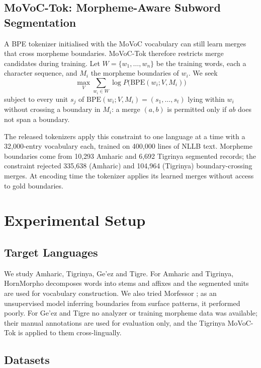 \documentclass[11pt]{article}
\newcommand{\movoctok}{MoVoC-Tok}
\begin{document}
\subsection{MoVoC-Tok: Morpheme-Aware Subword Segmentation}
\label{sec:movoctok}

A BPE tokenizer initialised with the MoVoC vocabulary can still learn merges
that cross morpheme boundaries. \movoctok{} therefore restricts merge
candidates during training. Let $W = \{w_1, \dots, w_n\}$ be the training words,
each a character sequence, and $M_i$ the morpheme boundaries of $w_i$. We seek
\begin{equation}
  \max_V \sum_{w_i \in W} \log P\bigl(\mathrm{BPE}(w_i; V, M_i)\bigr)
\end{equation}
subject to every unit $s_j$ of $\mathrm{BPE}(w_i; V, M_i) = (s_1, \dots, s_t)$
lying within $w_i$ without crossing a boundary in $M_i$: a merge $(a,b)$ is
permitted only if $ab$ does not span a boundary.

The released tokenizers apply this constraint to one language at a time with
a 32,000-entry vocabulary each, trained on 400,000 lines of NLLB text. Morpheme
boundaries come from 10,293 Amharic and 6,692 Tigrinya segmented records; the
constraint rejected 335,638 (Amharic) and 104,964 (Tigrinya)
boundary-crossing merges. At encoding time the tokenizer applies its learned
merges without access to gold boundaries.

\section{Experimental Setup}
\label{sec:setup}

\subsection{Target Languages}

We study Amharic, Tigrinya, Ge'ez and Tigre. For Amharic and Tigrinya,
HornMorpho decomposes words into stems and affixes and the segmented units are
used for vocabulary construction. We also tried Morfessor
\citep{creutz2007unsupervised}; as an unsupervised model inferring boundaries
from surface patterns, it performed poorly. For Ge'ez and Tigre no analyzer or
training morpheme data was available; their manual annotations are used for
evaluation only, and the Tigrinya \movoctok{} is applied to them
cross-lingually.

\subsection{Datasets}
\label{sec:data}
\end{document}
